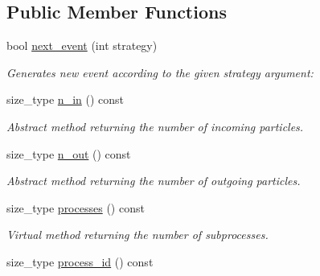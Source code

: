 \subsection*{Public Member Functions}
\begin{DoxyCompactItemize}
\item 
\hypertarget{a00444_ace5212a650916d3f321e9f61f90412fb}{bool \hyperlink{a00444_ace5212a650916d3f321e9f61f90412fb}{next\-\_\-event} (int strategy)}\label{a00444_ace5212a650916d3f321e9f61f90412fb}

\begin{DoxyCompactList}\small\item\em Generates new event according to the given strategy argument\-: \end{DoxyCompactList}\item 
\hypertarget{a00444_a1b95457bf8a2786d6dd666bb9986f0ab}{size\-\_\-type \hyperlink{a00444_a1b95457bf8a2786d6dd666bb9986f0ab}{n\-\_\-in} () const }\label{a00444_a1b95457bf8a2786d6dd666bb9986f0ab}

\begin{DoxyCompactList}\small\item\em Abstract method returning the number of incoming particles. \end{DoxyCompactList}\item 
\hypertarget{a00444_a90b1baeb4917b3b94517508bb3a9e5b5}{size\-\_\-type \hyperlink{a00444_a90b1baeb4917b3b94517508bb3a9e5b5}{n\-\_\-out} () const }\label{a00444_a90b1baeb4917b3b94517508bb3a9e5b5}

\begin{DoxyCompactList}\small\item\em Abstract method returning the number of outgoing particles. \end{DoxyCompactList}\item 
\hypertarget{a00444_a6dce63f603c0edca920f9c5859a2dfb4}{size\-\_\-type \hyperlink{a00444_a6dce63f603c0edca920f9c5859a2dfb4}{processes} () const }\label{a00444_a6dce63f603c0edca920f9c5859a2dfb4}

\begin{DoxyCompactList}\small\item\em Virtual method returning the number of subprocesses. \end{DoxyCompactList}\item 
\hypertarget{a00444_a3f9fb91b7bdd56cbd786a121f8baefc3}{size\-\_\-type \hyperlink{a00444_a3f9fb91b7bdd56cbd786a121f8baefc3}{process\-\_\-id} () const }\label{a00444_a3f9fb91b7bdd56cbd786a121f8baefc3}


\end{DoxyCompactItemize}
